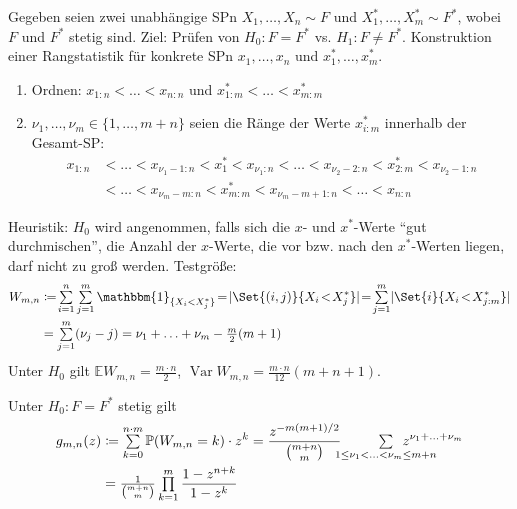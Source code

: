 \documentclass{cheat-sheet}
\renewcommand{\P}{\mathbb{P}} %
\newcommand{\E}{\mathbb{E}} %
\newcommand{\ind}{\mathbbm{1}} %
\DeclareMathOperator{\var}{Var} %
\begin{document}
\begin{situation}
  Gegeben seien zwei unabhängige SPn $X_1, \ldots, X_n \sim F$ und $X_1^{*}, \ldots, X_m^{*} \sim F^{*}$, wobei $F$ und $F^*$ stetig sind.
  Ziel: Prüfen von $H_0 : F = F^{*}$ vs. $H_1 : F \neq F^{*}$.
  Konstruktion einer Rangstatistik für konkrete SPn $x_1, \ldots, x_n$ und $x_1^{*}, \ldots, x_m^{*}$.
  \begin{enumerate}
    \item Ordnen: $x_{1:n} < \ldots < x_{n:n}$ und $x_{1:m}^{*} < \ldots < x_{m:m}^{*}$
    \item $\nu_1, \ldots, \nu_m \in \{ 1, \ldots, m+n \}$ seien die Ränge der Werte $x_{i:m}^{*}$ innerhalb der Gesamt-SP:
    \begin{align*}
      x_{1:n} & < \ldots < x_{\nu_1 - 1:n} < x_1^{*} < x_{\nu_1:n} < \ldots < x_{\nu_2 - 2:n} < x_{2:m}^{*} < x_{\nu_2 - 1:n} \\
      & < \ldots < x_{\nu_m-m:n} < x_{m:m}^{*} < x_{\nu_m - m + 1 : n} < \ldots < x_{n:n}
    \end{align*}
  \end{enumerate}
  Heuristik: $H_0$ wird angenommen, falls sich die $x$- und $x^{*}$-Werte "`gut durchmischen"', \dh{} die Anzahl der $x$-Werte, die vor bzw. nach den $x^{*}$-Werten liegen, darf nicht zu groß werden.
  Testgröße:
  \begin{align*}
    W_{m,n} & \coloneqq \! \sum_{i=1}^n \sum_{j=1}^m \ind_{\{ X_i < X_j^{*} \}} \!=\! \abs{\Set{(i, j)}{ X_i \!<\! X_j^{*}}} \!=\! \sum_{j=1}^m \abs{\Set{i}{X_i \!<\! X_{j:m}^{*}}} \\
    & = \sum_{j=1}^m (\nu_j - j) = \nu_1 + \ldots + \nu_m - \tfrac{m}{2} (m+1)
  \end{align*}
  Unter $H_0$ gilt \quad
  $\E W_{m,n} = \tfrac{m \cdot n}{2}$, \quad
  $\var W_{m,n} = \tfrac{m \cdot n}{12} (m + n + 1)$.
\end{situation}

\begin{lem}
  Unter $H_0 : F = F^*$ stetig gilt
  \begin{align*}
    g_{m,n}(z) & \coloneqq \sum_{k=0}^{n \cdot m} \P(W_{m,n} = k) \cdot z^k = \frac{z^{-m (m+1) / 2}}{\binom{m + n}{m}} \enspace\qquad \sum_{\mathclap{1 \leq \nu_1 < \ldots < \nu_m \leq m+n}} \enspace z^{\nu_1 + \ldots + \nu_m} \\
    & = \tfrac{1}{\binom{m + n}{m}} \prod_{k=1}^m \frac{1 - z^{n+k}}{1 - z^k}
  \end{align*}
\end{lem}
\end{document}
